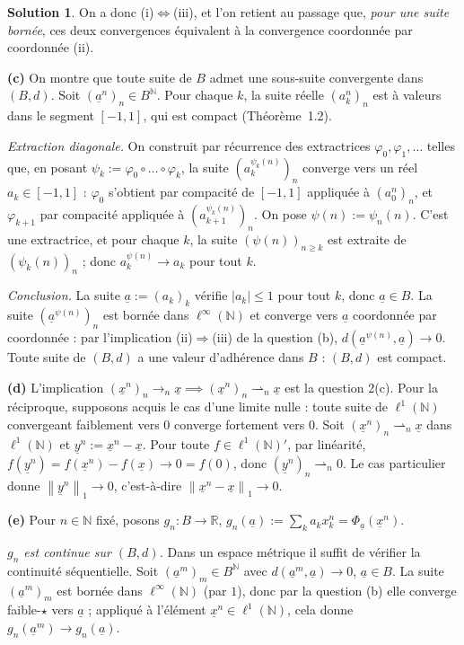 \documentclass[11pt,a4paper]{article}
\newcommand{\R}{\mathbb{R}}
\newcommand{\N}{\mathbb{N}}
\newcommand{\norm}[1]{\left\|#1\right\|}
\newcommand{\wk}{\rightharpoonup}
\theoremstyle{definition}
\newtheorem*{solution}{Solution}
\newcommand{\su}[1]{\underline{#1}}
\newcommand{\linf}{\ell^\infty(\N)}
\newcommand{\lun}{\ell^1(\N)}
\begin{document}
\begin{solution}
On a donc (i)$\iff$(iii), et l'on retient au passage que, \emph{pour une suite bornée}, ces deux convergences équivalent à la convergence coordonnée par coordonnée (ii).

\medskip
\noindent\textbf{(c)} On montre que toute suite de $B$ admet une sous-suite convergente dans $(B,d)$. Soit $(\su a^n)_n\in B^\N$. Pour chaque $k$, la suite réelle $(a^n_k)_n$ est à valeurs dans le segment $[-1,1]$, qui est compact (Théorème~1.2).

\emph{Extraction diagonale.} On construit par récurrence des extractrices $\varphi_0,\varphi_1,\dots$ telles que, en posant $\psi_k:=\varphi_0\circ\dots\circ\varphi_k$, la suite $(a^{\psi_k(n)}_k)_n$ converge vers un réel $a_k\in[-1,1]$ : $\varphi_0$ s'obtient par compacité de $[-1,1]$ appliquée à $(a^n_0)_n$, et $\varphi_{k+1}$ par compacité appliquée à $(a^{\psi_k(n)}_{k+1})_n$. On pose $\psi(n):=\psi_n(n)$. C'est une extractrice, et pour chaque $k$, la suite $(\psi(n))_{n\ge k}$ est extraite de $(\psi_k(n))_n$ ; donc $a^{\psi(n)}_k\to a_k$ pour tout $k$.

\emph{Conclusion.} La suite $\su a:=(a_k)_k$ vérifie $|a_k|\le1$ pour tout $k$, donc $\su a\in B$. La suite $(\su a^{\psi(n)})_n$ est bornée dans $\linf$ et converge vers $\su a$ coordonnée par coordonnée : par l'implication (ii)$\Rightarrow$(iii) de la question (b), $d(\su a^{\psi(n)},\su a)\to0$. Toute suite de $(B,d)$ a une valeur d'adhérence dans $B$ : $(B,d)$ est compact.

\medskip
\noindent\textbf{(d)} L'implication $(\su x^n)_n\to_n\su x\implies(\su x^n)_n\wk_n\su x$ est la question 2(c). Pour la réciproque, supposons acquis le cas d'une limite nulle : toute suite de $\lun$ convergeant faiblement vers $0$ converge fortement vers $0$. Soit $(\su x^n)_n\wk_n\su x$ dans $\lun$ et $\su y^n:=\su x^n-\su x$. Pour toute $f\in\lun'$, par linéarité, $f(\su y^n)=f(\su x^n)-f(\su x)\to0=f(0)$, donc $(\su y^n)_n\wk_n0$. Le cas particulier donne $\norm{\su y^n}_1\to0$, c'est-à-dire $\norm{\su x^n-\su x}_1\to0$.

\medskip
\noindent\textbf{(e)} Pour $n\in\N$ fixé, posons $g_n:B\to\R$, $g_n(\su a):=\sum_ka_kx^n_k=\Phi_{\su a}(\su x^n)$.

\emph{$g_n$ est continue sur $(B,d)$.} Dans un espace métrique il suffit de vérifier la continuité séquentielle. Soit $(\su a^m)_m\in B^\N$ avec $d(\su a^m,\su a)\to0$, $\su a\in B$. La suite $(\su a^m)_m$ est bornée dans $\linf$ (par $1$), donc par la question (b) elle converge faible-$\star$ vers $\su a$ ; appliqué à l'élément $\su x^n\in\lun$, cela donne $g_n(\su a^m)\to g_n(\su a)$.


\end{solution}
\end{document}
